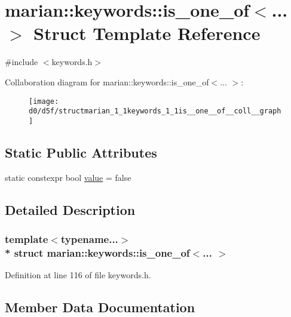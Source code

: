 \hypertarget{structmarian_1_1keywords_1_1is__one__of}{}\section{marian\+:\+:keywords\+:\+:is\+\_\+one\+\_\+of$<$... $>$ Struct Template Reference}
\label{structmarian_1_1keywords_1_1is__one__of}


{\ttfamily \#include $<$keywords.\+h$>$}



Collaboration diagram for marian\+:\+:keywords\+:\+:is\+\_\+one\+\_\+of$<$... $>$\+:
\nopagebreak
\begin{figure}[H]
\begin{center}
\leavevmode
\texttt{[image: d0/d5f/structmarian\_1\_1keywords\_1\_1is\_\_one\_\_of\_\_coll\_\_graph]}
\end{center}
\end{figure}
\subsection*{Static Public Attributes}
\begin{DoxyCompactItemize}
\item 
static constexpr bool \hyperlink{structmarian_1_1keywords_1_1is__one__of_a976c4f5f1d85eaac00d57ffe185200dd}{value} = false
\end{DoxyCompactItemize}


\subsection{Detailed Description}
\subsubsection*{template$<$typename...$>$\\*
struct marian\+::keywords\+::is\+\_\+one\+\_\+of$<$... $>$}



Definition at line 116 of file keywords.\+h.



\subsection{Member Data Documentation}
